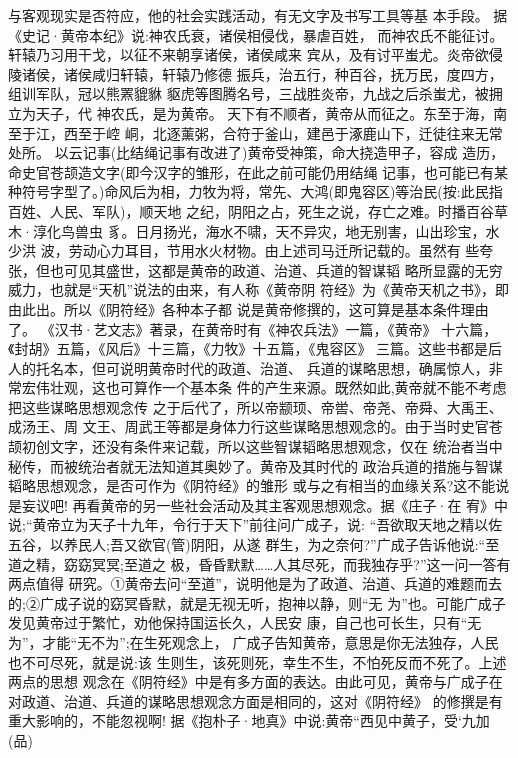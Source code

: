 \documentclass[12pt,UTF8]{ctexbook}
\begin{document}
与客观现实是否符应，他的社会实践活动，有无文字及书写工具等基
本手段。
据《史记·黄帝本纪》说:神农氏衰，诸侯相侵伐，暴虐百姓，
而神农氏不能征讨。轩辕乃习用干戈，以征不来朝享诸侯，诸侯咸来
宾从，及有讨平蚩尤。炎帝欲侵陵诸侯，诸侯咸归轩辕，轩辕乃修德
振兵，治五行，种百谷，抚万民，度四方，组训军队，冠以熊罴貔貅
䝙虎等图腾名号，三战胜炎帝，九战之后杀蚩尤，被拥立为天子，代
神农氏，是为黄帝。
天下有不顺者，黄帝从而征之。东至于海，南至于江，西至于崆
峒，北逐薰粥，合符于釜山，建邑于涿鹿山下，迁徒往来无常处所。
以云记事(比结绳记事有改进了)黄帝受神策，命大挠造甲子，容成
造历，命史官苍颉造文字(即今汉字的雏形，在此之前可能仍用结绳
记事，也可能已有某种符号字型了。)命风后为相，力牧为将，常先、大鸿(即鬼容区)等治民(按:此民指百姓、人民、军队)，顺天地
之纪，阴阳之占，死生之说，存亡之难。时播百谷草木·淳化鸟兽虫
豸。日月扬光，海水不啸，天不异灾，地无别害，山出珍宝，水少洪
波，劳动心力耳目，节用水火材物。由上述司马迁所记载的。虽然有
些夸张，但也可见其盛世，这都是黄帝的政道、治道、兵道的智谋韬
略所显露的无穷威力，也就是“天机”说法的由来，有人称《黄帝阴
符经》为《黄帝天机之书》，即由此出。所以《阴符经》各种本子都
说是黄帝修撰的，这可算是基本条件理由了。
《汉书·艺文志》著录，在黄帝时有《神农兵法》一篇，《黄帝》
十六篇，《封胡》五篇，《风后》十三篇，《力牧》十五篇，《鬼容区》
三篇。这些书都是后人的托名本，但可说明黄帝时代的政道、治道、
兵道的谋略思想，确属惊人，非常宏伟壮观，这也可算作一个基本条
件的产生来源。既然如此,黄帝就不能不考虑把这些谋略思想观念传
之于后代了，所以帝颛顼、帝喾、帝尧、帝舜、大禹王、成汤王、周
文王、周武王等都是身体力行这些谋略思想观念的。由于当时史官苍
颉初创文字，还没有条件来记载，所以这些智谋韬略思想观念，仅在
统治者当中秘传，而被统治者就无法知道其奥妙了。黄帝及其时代的
政治兵道的措施与智谋韬略思想观念，是否可作为《阴符经》的雏形
或与之有相当的血缘关系?这不能说是妄议吧!
再看黄帝的另一些社会活动及其主客观思想观念。据《庄子·在
宥》中说;“黄帝立为天子十九年，令行于天下”前往问广成子，说:
“吾欲取天地之精以佐五谷，以养民人;吾又欲官(管)阴阳，从遂
群生，为之奈何?”广成子告诉他说:“至道之精，窈窈冥冥;至道之
极，昏昏默默……人其尽死，而我独存乎?”这一问一答有两点值得
研究。①黄帝去问“至道”，说明他是为了政道、治道、兵道的难题而去的;②广成子说的窈冥昏默，就是无视无听，抱神以静，则“无
为”也。可能广成子发见黄帝过于繁忙，劝他保持国运长久，人民安
康，自己也可长生，只有“无为”，才能“无不为”;在生死观念上，
广成子告知黄帝，意思是你无法独存，人民也不可尽死，就是说:该
生则生，该死则死，幸生不生，不怕死反而不死了。上述两点的思想
观念在《阴符经》中是有多方面的表达。由此可见，黄帝与广成子在
对政道、治道、兵道的谋略思想观念方面是相同的，这对《阴符经》
的修撰是有重大影响的，不能忽视啊!
据《抱朴子·地真》中说:黄帝“西见中黄子，受‘九加(品)
\end{document}
